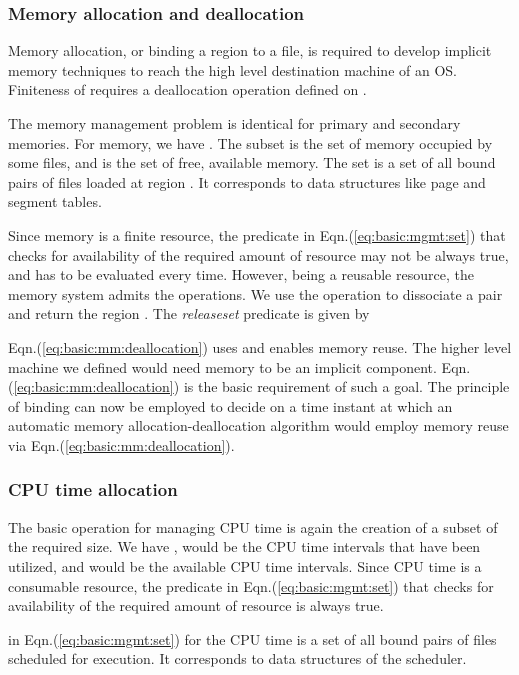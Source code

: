 \documentclass[draft]{article}
\def\eqn#1{Eqn.(\ref{#1})}
\begin{document}
\subsubsection{Memory allocation and deallocation}
\label{sec:basic:mm}

Memory  allocation, or  binding a  region to  a file,  is  required to
develop implicit memory techniques to reach the high level destination
machine of an OS.  Finiteness of  requires a deallocation operation
defined on .

The memory  management problem is identical for  primary and secondary
memories.  For memory, we have .  The subset  is the
set of  memory occupied by some files,  and  is the  set of free,
available memory.   The set  is a  set of all bound  pairs  of
files  loaded at region .  It corresponds to data structures
like page and segment tables.

Since memory  is a finite resource,  the predicate  in
\eqn{eq:basic:mgmt:set} that  checks for availability  of the required
amount of  resource may not  be always true,  and has to  be evaluated
every  time.  However, being  a reusable  resource, the  memory system
admits the  operations.  We use the  operation
to dissociate  a pair  and  return the region
.  The \emph{releaseset} predicate is given by

\eqn{eq:basic:mm:deallocation}  uses    and enables  memory
reuse.  The higher level machine we defined would need memory to be an
implicit  component.    \eqn{eq:basic:mm:deallocation}  is  the  basic
requirement  of such  a goal.   The principle  of binding  can  now be
employed  to decide on  a time  instant at  which an  automatic memory
allocation-deallocation  algorithm  would   employ  memory  reuse  via
\eqn{eq:basic:mm:deallocation}.

\subsubsection{CPU time allocation}
\label{sec:basic:cpu:time}

The basic operation  for managing CPU time is again  the creation of a
subset of the required size.  We have ,  would be the
CPU  time intervals that  have been  utilized, and   would  be the
available  CPU  time  intervals.   Since  CPU  time  is  a  consumable
resource,  the predicate    in \eqn{eq:basic:mgmt:set}
that checks  for availability  of the required  amount of  resource is
always true.

 in \eqn{eq:basic:mgmt:set} for the CPU  time is a set of all bound
pairs  of files  scheduled for execution.  It corresponds to
data structures of the scheduler.
\end{document}

